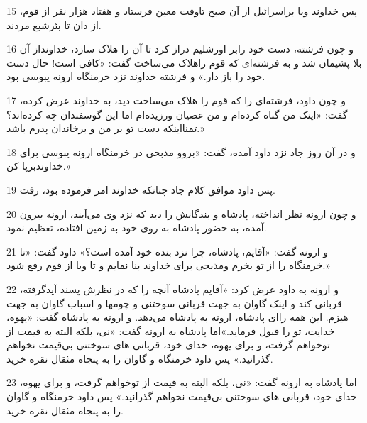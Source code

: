 \par 15 پس خداوند وبا براسرائیل از آن صبح تاوقت معین فرستاد و هفتاد هزار نفر از قوم، از دان تا بئرشبع مردند.
\par 16 و چون فرشته، دست خود رابر اورشلیم دراز کرد تا آن را هلاک سازد، خداونداز آن بلا پشیمان شد و به فرشته‌ای که قوم راهلاک می‌ساخت گفت: «کافی است! حال دست خود را باز دار.» و فرشته خداوند نزد خرمنگاه ارونه یبوسی بود.
\par 17 و چون داود، فرشته‌ای را که قوم را هلاک می‌ساخت دید، به خداوند عرض کرده، گفت: «اینک من گناه کرده‌ام و من عصیان ورزیده‌ام اما این گوسفندان چه کرده‌اند؟ تمنااینکه دست تو بر من و برخاندان پدرم باشد.»
\par 18 و در آن روز جاد نزد داود آمده، گفت: «بروو مذبحی در خرمنگاه ارونه یبوسی برای خداوندبرپا کن.»
\par 19 پس داود موافق کلام جاد چنانکه خداوند امر فرموده بود، رفت.
\par 20 و چون ارونه نظر انداخته، پادشاه و بندگانش را دید که نزد وی می‌آیند، ارونه بیرون آمده، به حضور پادشاه به روی خود به زمین افتاده، تعظیم نمود.
\par 21 و ارونه گفت: «آقایم، پادشاه، چرا نزد بنده خود آمده است؟» داود گفت: «تا خرمنگاه را از تو بخرم ومذبحی برای خداوند بنا نمایم و تا وبا از قوم رفع شود.»
\par 22 و ارونه به داود عرض کرد: «آقایم پادشاه آنچه را که در نظرش پسند آیدگرفته، قربانی کند و اینک گاوان به جهت قربانی سوختنی و چومها و اسباب گاوان به جهت هیزم. این همه را‌ای پادشاه، ارونه به پادشاه می‌دهد. و ارونه به پادشاه گفت: «یهوه، خدایت، تو را قبول فرماید.»اما پادشاه به ارونه گفت: «نی، بلکه البته به قیمت از توخواهم گرفت، و برای یهوه، خدای خود، قربانی های سوختنی بی‌قیمت نخواهم گذرانید.» پس داود خرمنگاه و گاوان را به پنجاه مثقال نقره خرید.
\par 23 اما پادشاه به ارونه گفت: «نی، بلکه البته به قیمت از توخواهم گرفت، و برای یهوه، خدای خود، قربانی های سوختنی بی‌قیمت نخواهم گذرانید.» پس داود خرمنگاه و گاوان را به پنجاه مثقال نقره خرید.


